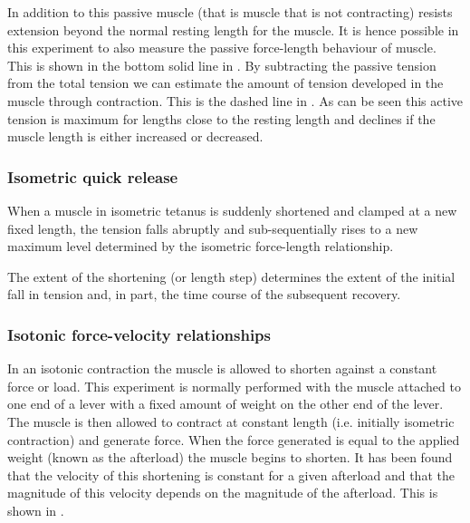 In addition to this passive muscle (that is muscle that is not contracting)
resists extension beyond the normal resting length for the muscle. It is hence
possible in this experiment to also measure the passive force-length behaviour
of muscle. This is shown in the bottom solid line in
. By subtracting the passive tension from the
total tension we can estimate the amount of tension developed in the muscle
through contraction. This is the dashed line in
. As can be seen this active tension is
maximum for lengths close to the resting length and declines if the muscle
length is either increased or decreased.

\subsubsection{Isometric quick release}

When a muscle in isometric tetanus is suddenly shortened and clamped at a new
fixed length, the tension falls abruptly and sub-sequentially rises to a new
maximum level determined by the isometric force-length relationship.


The extent of the shortening (or length step) determines the extent of the
initial fall in tension and, in part, the time course of the subsequent
recovery.

\subsubsection{Isotonic force-velocity relationships}

In an isotonic contraction the muscle is allowed to shorten against a constant
force or load. This experiment is normally performed with the muscle attached
to one end of a lever with a fixed amount of weight on the other end of the
lever. The muscle is then allowed to contract at constant length (i.e.
initially isometric contraction) and generate force. When the force generated
is equal to the applied weight (known as the afterload) the muscle begins to
shorten. It has been found that the velocity of this shortening is constant
for a given afterload and that the magnitude of this velocity depends on the
magnitude of the afterload. This is shown in .


